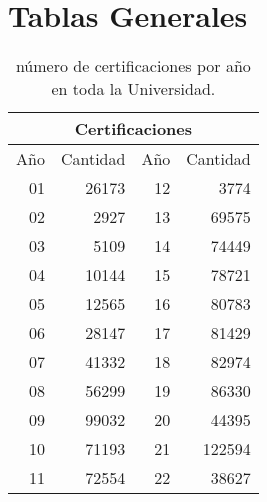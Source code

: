 \documentclass[12pt]{article}
\begin{document}
\section{Tablas Generales}



\begin{table}[ht]
\centering
\begin{tabular}{||r||r||r|r||}\hline
\multicolumn{4}{|c|}{Certificaciones} \\\hline
Año  & Cantidad  & Año  & Cantidad  \\\hline
01 & 26173& 12 & 3774 \\ 
  02 & 2927 &13 & 69575  \\ 
  03 & 5109 & 14 & 74449\\ 
  04 & 10144 & 15 & 78721\\ 
  05 & 12565 &16 & 80783 \\ 
  06 & 28147 &17 & 81429\\ 
  07 & 41332 &18 & 82974\\ 
  08 & 56299 &19 & 86330\\ 
  09 & 99032 &20 & 44395\\ 
  10 & 71193 &21 & 122594 \\ 
  11 & 72554 &22 & 38627\\
\hline
\end{tabular}
\caption{\label{CertificacionesAnual}n\'umero de certificaciones por a\~no en toda la Universidad.}
\end{table}
\end{document}
